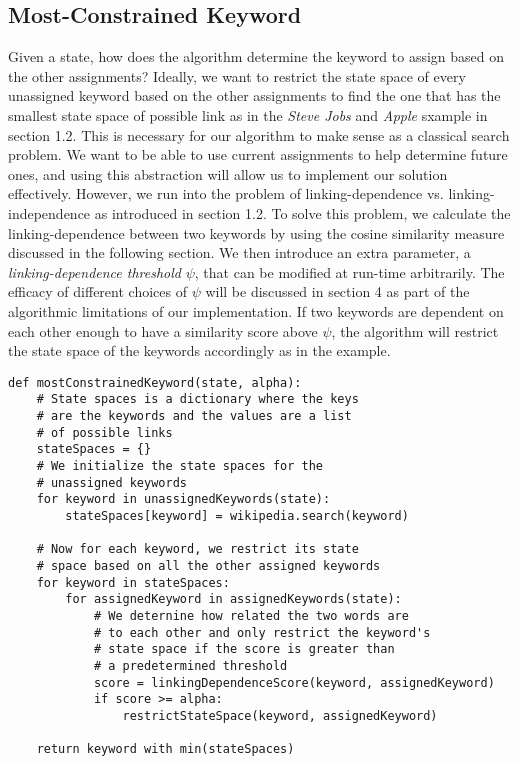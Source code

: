 \documentclass[twoside,11pt]{article}
\begin{document}
\subsection{Most-Constrained Keyword}

Given a state, how does the algorithm determine the keyword to assign based on the other assignments? Ideally, we want to restrict the state space of every unassigned keyword based on the other assignments to find the one that has the smallest state space of possible link as in the \textit{Steve Jobs} and \textit{Apple} sxample in section 1.2. This is necessary for our algorithm to make sense as a classical search problem. We want to be able to use current assignments to help determine future ones, and using this abstraction will allow us to implement our solution effectively. However, we run into the problem of linking-dependence vs. linking-independence as introduced in section 1.2. To solve this problem, we calculate the linking-dependence between two keywords by using the cosine similarity measure discussed in the following section. We then introduce an extra parameter, a \textit{linking-dependence threshold} $\psi$, that can be modified at run-time arbitrarily. The efficacy of different choices of $\psi$ will be discussed in section 4 as part of the algorithmic limitations of our implementation. If two keywords are dependent on each other enough to have a similarity score above $\psi$, the algorithm will restrict the state space of the keywords accordingly as in the example.

\begin{lstlisting}
def mostConstrainedKeyword(state, alpha):
    # State spaces is a dictionary where the keys
    # are the keywords and the values are a list
    # of possible links
    stateSpaces = {}
    # We initialize the state spaces for the
    # unassigned keywords
    for keyword in unassignedKeywords(state):
        stateSpaces[keyword] = wikipedia.search(keyword)

    # Now for each keyword, we restrict its state
    # space based on all the other assigned keywords
    for keyword in stateSpaces:
        for assignedKeyword in assignedKeywords(state):
            # We deternine how related the two words are
            # to each other and only restrict the keyword's
            # state space if the score is greater than
            # a predetermined threshold
            score = linkingDependenceScore(keyword, assignedKeyword)
            if score >= alpha:
                restrictStateSpace(keyword, assignedKeyword)

    return keyword with min(stateSpaces)
\end{lstlisting}
\end{document}
